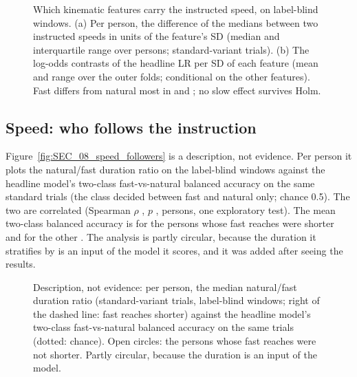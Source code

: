 \begin{figure}[tbp]
\centering
{}
\caption{Which kinematic features carry the instructed speed, on label-blind windows. (a) Per person, the
difference of the medians between two instructed speeds in units of the feature's SD (median and interquartile
range over persons; standard-variant trials). (b) The log-odds contrasts of the headline LR per SD of each
feature (mean and range over the outer folds; conditional on the other features). Fast differs from natural most
in  and ; no slow effect survives Holm.}
\label{fig:SEC_03_speed_features}\label{fig:app:sec-features}
\end{figure}

{\let\small\footnotesize\renewcommand{\arraystretch}{0.95}}

\FloatBarrier
\subsection{Speed: who follows the instruction}\label{app:sec:followers}

Figure~\ref{fig:SEC_08_speed_followers} is a description, not evidence. Per person it plots the natural/fast
duration ratio on the label-blind windows against the headline model's two-class fast-vs-natural balanced
accuracy on the same standard trials (the class decided between fast and natural only; chance 0.5). The two are
correlated (Spearman $\rho$ , $p$ ,  persons, one exploratory test). The
mean two-class balanced accuracy is  for the  persons whose fast
reaches were shorter and  for the other . The analysis is partly circular,
because the duration it stratifies by is an input of the model it scores, and it was added after seeing the
results.

\begin{figure}[tbp]
\centering
{}
\caption{Description, not evidence: per person, the median natural/fast duration ratio (standard-variant trials,
label-blind windows; right of the dashed line: fast reaches shorter) against the headline model's two-class
fast-vs-natural balanced accuracy on the same trials (dotted: chance). Open circles: the persons whose fast
reaches were not shorter. Partly circular, because the duration is an input of the model.}
\label{fig:SEC_08_speed_followers}\label{fig:app:sec-followers}
\end{figure}

